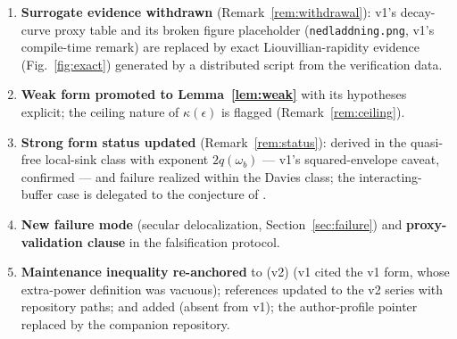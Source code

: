 \documentclass[11pt,a4paper]{article}
\theoremstyle{plain}
\theoremstyle{definition}
\theoremstyle{remark}
\newcommand{\eps}{\epsilon}
\begin{document}
\begin{enumerate}
\item \textbf{Surrogate evidence withdrawn} (Remark~\ref{rem:withdrawal}):
v1's decay-curve proxy table and its broken figure placeholder
(\texttt{nedladdning.png}, v1's compile-time remark) are replaced by exact
Liouvillian-rapidity evidence (Fig.~\ref{fig:exact}) generated by a
distributed script from the \cite{HCut} verification data.
\item \textbf{Weak form promoted to Lemma~\ref{lem:weak}} with its
hypotheses explicit; the ceiling nature of $\kappa(\eps)$ is flagged
(Remark~\ref{rem:ceiling}).
\item \textbf{Strong form status updated} (Remark~\ref{rem:status}): derived
in the quasi-free local-sink class with exponent $2q(\omega_b)$ --- v1's
squared-envelope caveat, confirmed --- and failure realized within the Davies
class; the interacting-buffer case is delegated to the conjecture of
\cite{HCut}.
\item \textbf{New failure mode} (secular delocalization,
Section~\ref{sec:failure}) and \textbf{proxy-validation clause} in the
falsification protocol.
\item \textbf{Maintenance inequality re-anchored} to \cite{MaintWork} (v2)
(v1 cited the v1 form, whose extra-power definition was vacuous); references
updated to the v2 series with repository paths; \cite{Stress} and
\cite{Closure} added (absent from v1); the author-profile pointer replaced by
the companion repository.
\end{enumerate}
\end{document}
